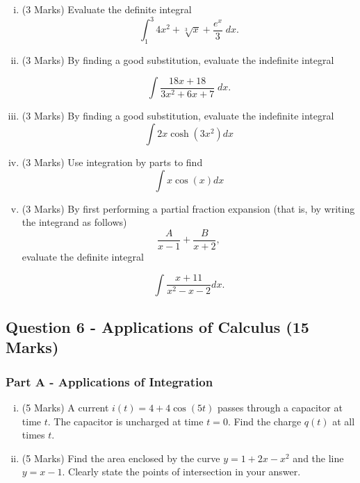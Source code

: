 \documentclass[a4paper,12pt]{article}
\begin{document}
\begin{enumerate}[(i)]
	\item (3 Marks)  Evaluate the definite integral
	\[ \int^3_1 4x^2 + \sqrt[3]{x} + \frac{e^x}{3} \;dx. \]
	\item (3 Marks) By finding a good substitution, evaluate the indefinite integral
	
	\[ \int \frac{18x + 18}{3x^2 + 6x + 7} \;dx.\]
	
	\item (3 Marks) By finding a good substitution, evaluate the indefinite integral
	\[ \int 2x \cosh(3x^2) dx \]
	\item (3 Marks) 
   Use integration by parts to find \[ \int x \cos(x) dx \]
	\item (3 Marks) By first performing a partial fraction expansion (that is, by writing the integrand
	as follows)
	\[  \frac{A}{x - 1} + \frac{B}{x + 2},
	\]evaluate the definite integral
	
	\[ \int \frac{x + 11}{x^2 - x - 2}  dx. \]
	
\end{enumerate}
\bigskip 

\newpage
\subsection*{Question 6 - Applications of Calculus (15 Marks)}

\subsubsection*{Part A - Applications of Integration}
\begin{enumerate}[(i)]
	\item (5 Marks) A current $i(t) = 4 + 4\cos(5t)$ passes through a capacitor at time $t$.
	The capacitor is uncharged at time $ t = 0 $. Find the charge $q(t)$ at all times $t$.
	\smallskip
	\item (5 Marks) Find the area enclosed by the curve $y=1+2x-x^2$ and the line $y=x-1$.
	Clearly state the points of intersection in your answer.
	\smallskip

\end{enumerate}
\end{document}
